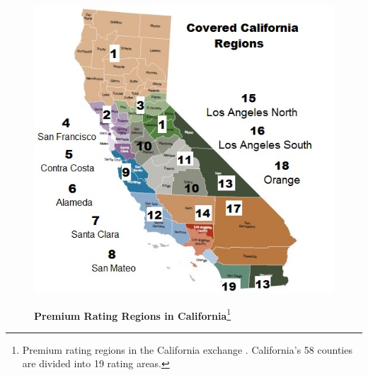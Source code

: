 \documentclass[12pt]{article}
\begin{document}
\newpage
\begin{figure}[htbp]
\centering
\footnotesize
\begin{minipage}[h]{6in}
\caption[caption]{\textbf{Premium Rating Regions in California}\footnote{Premium rating regions in the California exchange \citep{CARATE2016}. California's 58 counties are divided into 19 rating areas.}}
\centerline{%
    \includegraphics[scale=.45]{finals/pics/CA_Rating_Regions2.jpg}	
}
\label{rating_area_partitions}
\end{minipage}
\end{figure}  
\end{document}
